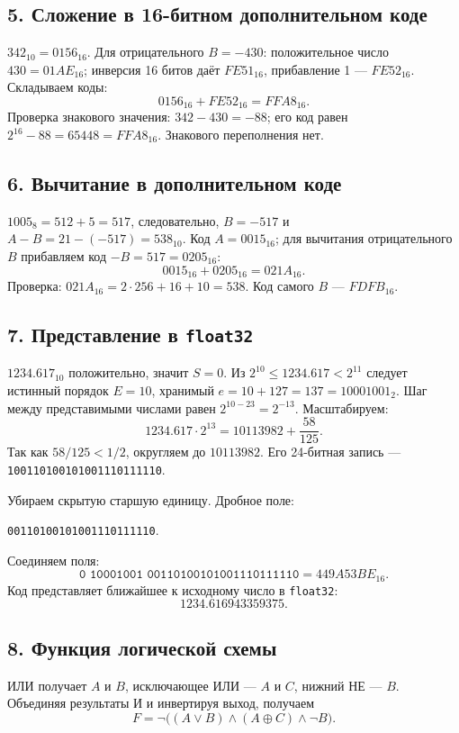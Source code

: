 \subsection*{5. Сложение в 16-битном дополнительном коде}
$342_{10}=0156_{16}$. Для отрицательного $B=-430$: положительное число $430=01AE_{16}$; инверсия 16 битов даёт $FE51_{16}$, прибавление 1 --- $FE52_{16}$. Складываем коды:
\[
0156_{16}+FE52_{16}=\boxed{FFA8_{16}}.
\]
Проверка знакового значения: $342-430=-88$; его код равен $2^{16}-88=65448=FFA8_{16}$. Знакового переполнения нет.

\subsection*{6. Вычитание в дополнительном коде}
$1005_8=512+5=517$, следовательно, $B=-517$ и $A-B=21-(-517)=538_{10}$. Код $A=0015_{16}$; для вычитания отрицательного $B$ прибавляем код $-B=517=0205_{16}$:
\[
0015_{16}+0205_{16}=\boxed{021A_{16}}.
\]
Проверка: $021A_{16}=2\cdot256+16+10=538$. Код самого $B$ --- $FDFB_{16}$.

\subsection*{7. Представление в \texttt{float32}}
$1234.617_{10}$ положительно, значит $S=0$. Из $2^{10}\le1234.617<2^{11}$ следует истинный порядок $E=10$, хранимый $e=10+127=137=10001001_2$. Шаг между представимыми числами равен $2^{10-23}=2^{-13}$. Масштабируем:
\[
1234.617\cdot2^{13}=10113982+\frac{58}{125}.
\]
Так как $58/125<1/2$, округляем до $10113982$. Его 24-битная запись --- \texttt{100110100101001110111110}.
\par\noindent Убираем скрытую старшую единицу. Дробное поле:
\begin{center}
\texttt{00110100101001110111110}.
\end{center}
Соединяем поля:
\[
\texttt{0 10001001 00110100101001110111110}
=\boxed{449A53BE_{16}}.
\]
Код представляет ближайшее к исходному число в \texttt{float32}:
\[
1234.616943359375.
\]

\subsection*{8. Функция логической схемы}
ИЛИ получает $A$ и $B$, исключающее ИЛИ --- $A$ и $C$, нижний НЕ --- $B$. Объединяя результаты И и инвертируя выход, получаем
\[
\boxed{F=\lnot\bigl((A\lor B)\land(A\oplus C)\land\lnot B\bigr)}.
\]
